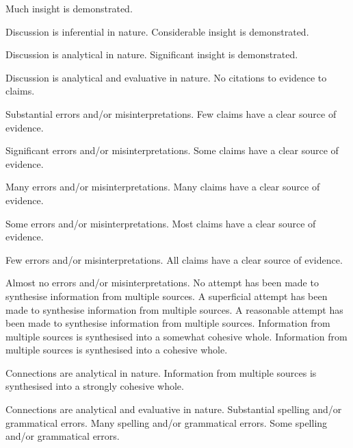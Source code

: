 \documentclass{../../fal_assignment}
\begin{document}
\begin{markingrubric}
        \grade		Much insight is demonstrated.
        \par		Discussion is inferential in nature.
        \grade		Considerable insight is demonstrated.
        \par		Discussion is analytical in nature.
        \grade		Significant insight is demonstrated.
        \par		Discussion is analytical and evaluative in nature.
%
        \grade\fail 	No citations to evidence to claims.
        \par 		Substantial errors and/or misinterpretations.
        \grade 		Few claims have a clear source of evidence.
        \par 		Significant errors and/or misinterpretations.
        \grade 		Some claims have a clear source of evidence.
        \par 		Many errors and/or misinterpretations.
        \grade 		Many claims have a clear source of evidence.
        \par 		Some errors and/or misinterpretations.
        \grade 		Most claims have a clear source of evidence.
        \par 		Few errors and/or misinterpretations.
        \grade 		All claims have a clear source of evidence.
        \par 		Almost no errors and/or misinterpretations.
%
        \grade\fail No attempt has been made to synthesise information from multiple sources.
        \grade		A superficial attempt has been made to synthesise information from multiple sources.
        \grade		A reasonable attempt has been made to synthesise information from multiple sources.
        \grade		Information from multiple sources is synthesised into a somewhat cohesive whole.
        \grade		Information from multiple sources is synthesised into a cohesive whole.
        \par		Connections are analytical in nature.
        \grade		Information from multiple sources is synthesised into a strongly cohesive whole.
        \par		Connections are analytical and evaluative in nature.
%
        \grade\fail 	Substantial spelling and/or grammatical errors.
        \grade 		Many spelling and/or grammatical errors.
        \grade 		Some spelling and/or grammatical errors.  

\end{markingrubric}
\end{document}
